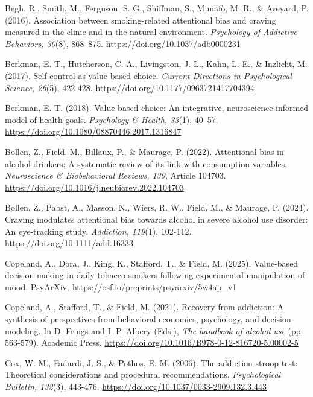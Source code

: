 \documentclass[authordate, reflection, issue]{jote-new-article}
\begin{document}
	Begh, R., Smith, M., Ferguson, S. G., Shiffman, S., Munafò, M. R., \& Aveyard, P. (2016). Association between smoking-related attentional bias and craving measured in the clinic and in the natural environment. \emph{Psychology of Addictive Behaviors, 30}(8), 868--875. \url{https://doi.org/10.1037/adb0000231}



	Berkman, E. T., Hutcherson, C. A., Livingston, J. L., Kahn, L. E., \& Inzlicht, M. (2017). Self-control as value-based choice. \emph{Current Directions in Psychological Science, 26}(5), 422-428. \url{https://doi.org/10.1177/0963721417704394}



	Berkman, E. T. (2018). Value-based choice: An integrative, neuroscience-informed model of health goals. \emph{Psychology \& Health, 33}(1), 40--57. \url{https://doi.org/10.1080/08870446.2017.1316847}



	Bollen, Z., Field, M., Billaux, P., \& Maurage, P. (2022). Attentional bias in alcohol drinkers: A systematic review of its link with consumption variables. \emph{Neuroscience \& Biobehavioral Reviews, 139}, Article 104703. \url{https://doi.org/10.1016/j.neubiorev.2022.104703}



	Bollen, Z., Pabst, A., Masson, N., Wiers, R. W., Field, M., \& Maurage, P. (2024). Craving modulates attentional bias towards alcohol in severe alcohol use disorder: An eye-tracking study. \emph{Addiction, 119}(1), 102-112. \url{https://doi.org/10.1111/add.16333}



	Copeland, A., Dora, J., King, K., Stafford, T., \& Field, M. (2025). Value-based decision-making in daily tobacco smokers following experimental manipulation of mood. PsyArXiv\emph{. }https://osf.io/preprints/psyarxiv/5w4ap\_v1



	Copeland, A., Stafford, T., \& Field, M. (2021). Recovery from addiction: A synthesis of perspectives from behavioral economics, psychology, and decision modeling. In D. Frings and I. P. Albery (Eds.), \emph{The handbook of alcohol use} (pp. 563-579). Academic Press. \url{https://doi.org/10.1016/B978-0-12-816720-5.00002-5}



	Cox, W. M., Fadardi, J. S., \& Pothos, E. M. (2006). The addiction-stroop test: Theoretical considerations and procedural recommendations. \emph{Psychological Bulletin, 132}(3), 443-476. \url{https://doi.org/10.1037/0033-2909.132.3.443}
\end{document}

